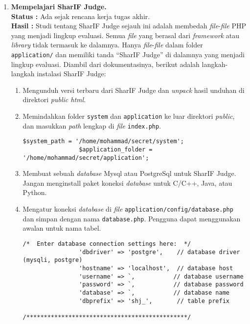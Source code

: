 \documentclass[a4paper,twoside]{article}
\begin{document}
	\begin{enumerate}
		\item \textbf{Mempelajari SharIF Judge.}\\
		{\bf Status :} Ada sejak rencana kerja tugas akhir.\\
		{\bf Hasil :} Studi tentang SharIF Judge sejauh ini adalah membedah \textit{file}-\textit{file} PHP yang menjadi lingkup evaluasi. Semua \textit{file} yang berasal dari \textit{framework} atau \textit{library} tidak termasuk ke dalamnya. Hanya \textit{file}-\textit{file} dalam folder \verb|application/| dan memiliki tanda ``SharIF Judge'' di dalamnya yang menjadi lingkup evaluasi. Diambil dari dokumentasinya, berikut adalah langkah-langkah instalasi SharIF Judge:
		\begin{enumerate}
			 \item Mengunduh versi terbaru dari SharIF Judge dan \textit{unpack} hasil unduhan di direktori \textit{public html}.
			 \item Memindahkan folder \verb|system| dan \verb|application| ke luar direktori \textit{public}, dan masukkan \textit{path} lengkap di \textit{file} \verb|index.php|.
			 \begin{lstlisting}[basicstyle=\ttfamily, frame=single,
			 	columns=fullflexible, keepspaces=true, breaklines=true, label=ls:2]
			 	$system_path = '/home/mohammad/secret/system';
			 	$application_folder = '/home/mohammad/secret/application';
			 \end{lstlisting}
			 \item Membuat sebuah \textit{database} Mysql atau PostgreSql untuk SharIF Judge. Jangan menginstall paket koneksi \textit{database} untuk C/C++, Java, atau Python.
			 \item Mengatur koneksi \textit{database} di \textit{file} \verb|application/config/database.php| dan simpan dengan nama \verb|database.php|. Pengguna dapat
			 menggunakan awalan untuk nama tabel.
			 \begin{lstlisting}[basicstyle=\ttfamily, frame=single,
			 	columns=fullflexible, keepspaces=true, breaklines=true, label=ls:3]
			 	/*  Enter database connection settings here:  */
			 	'dbdriver' => 'postgre',    // database driver (mysqli, postgre)
			 	'hostname' => 'localhost',  // database host
			 	'username' => `,           // database username
			 	'password' => `,           // database password
			 	'database' => `,           // database name
			 	'dbprefix' => 'shj_',       // table prefix
			 	/**********************************************/
			 \end{lstlisting}

\end{enumerate}
\end{enumerate}
\end{document}
